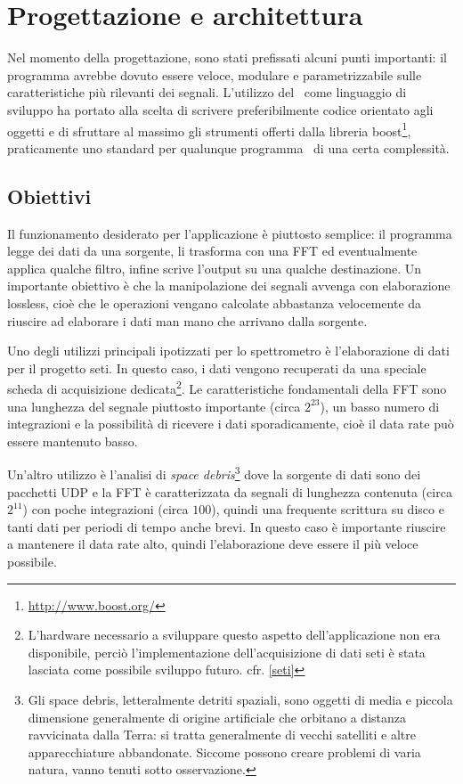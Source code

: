 \chapter{Progettazione e architettura}
\label{outline}
Nel momento della progettazione, sono stati prefissati alcuni punti importanti:
il programma avrebbe dovuto essere veloce, modulare e parametrizzabile sulle
caratteristiche pi\`u rilevanti dei segnali. L'utilizzo del \CC\, come linguaggio di
sviluppo ha portato alla scelta di scrivere preferibilmente codice orientato
agli oggetti e di sfruttare al massimo gli strumenti offerti dalla libreria
boost\footnote{\url{http://www.boost.org/}}, praticamente uno standard per
qualunque programma \CC\, di una certa complessit\`a.
\section{Obiettivi}
Il funzionamento desiderato per l'applicazione \`e piuttosto semplice: il
programma legge dei dati da una sorgente, li trasforma con una \ac{FFT} ed
eventualmente applica qualche filtro, infine scrive l'output su una qualche
destinazione. Un importante obiettivo \`e che la manipolazione dei segnali
avvenga con elaborazione lossless, cio\`e che le operazioni vengano calcolate
abbastanza velocemente da riuscire ad elaborare i dati man mano che arrivano
dalla sorgente.

Uno degli utilizzi principali ipotizzati per lo spettrometro \`e l'elaborazione
di dati per il progetto \ac{seti}. In questo caso, i dati vengono recuperati da
una speciale scheda di acquisizione dedicata\footnote{L'hardware necessario a
sviluppare questo aspetto dell'applicazione non era disponibile, perci\`o
l'implementazione dell'acquisizione di dati \ac{seti} \`e stata lasciata come
possibile sviluppo futuro. cfr. \ref{seti}}.  Le caratteristiche fondamentali
della \ac{FFT} sono una lunghezza del segnale piuttosto importante (circa
$2^{23}$), un basso numero di integrazioni e la possibilit\`a di ricevere i dati
sporadicamente, cio\`e il data rate pu\`o essere mantenuto basso.

Un'altro utilizzo \`e l'analisi di \emph{space debris}\footnote{Gli space
debris, letteralmente detriti spaziali, sono oggetti di media e piccola
    dimensione generalmente di origine artificiale che orbitano a distanza
    ravvicinata dalla Terra: si tratta generalmente di vecchi satelliti e altre
    apparecchiature abbandonate. Siccome possono creare problemi di varia
    natura, vanno tenuti sotto osservazione.} dove la sorgente di dati sono
dei pacchetti UDP e la \ac{FFT} \`e caratterizzata da segnali di lunghezza contenuta
(circa $2^{11}$) con poche integrazioni (circa $100$), quindi una frequente
scrittura su disco e tanti dati per periodi di tempo anche brevi. In questo caso
\`e importante riuscire a mantenere il data rate alto, quindi l'elaborazione
deve essere il pi\`u veloce possibile.

